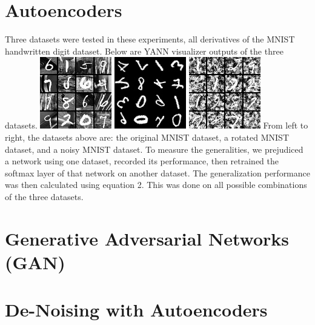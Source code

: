 \documentclass[conference,compsoc]{IEEEtran}
\begin{document}
\section{Autoencoders}
Three datasets were tested in these experiments, all derivatives of the MNIST handwritten digit dataset. Below are YANN visualizer outputs of the three datasets. 
\includegraphics[scale=0.65]{orig}
\includegraphics[scale=0.65]{rot}
\includegraphics[scale=0.65]{noisy}
From left to right, the datasets above are: the original MNIST dataset, a rotated MNIST dataset, and a noisy MNIST dataset. To measure the generalities, we prejudiced a network using one dataset, recorded its performance, then retrained the softmax layer of that network on another dataset. The generalization performance was then calculated using equation 2. This was done on all possible combinations of the three datasets. 

\section{Generative Adversarial Networks (GAN)}
\section{De-Noising with Autoencoders}
\end{document}
